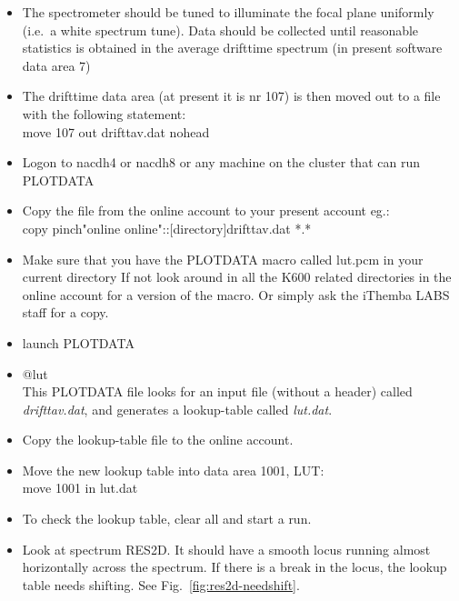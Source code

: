 \documentclass[11pt]{report}
\begin{document}
\begin{itemize}
\item   The spectrometer should be tuned to illuminate the 
focal plane uniformly (i.e.~a white spectrum tune).  
Data should be collected until reasonable statistics is obtained in the 
average drifttime spectrum (in present software data area 7)

\item   The drifttime data area (at present it is nr 107) is then moved out to a file with the following statement:\\ 
        move 107 out drifttav.dat nohead

\item   Logon to nacdh4 or nacdh8 or any machine on the cluster that can 
run PLOTDATA

\item   Copy the file from the online account to your present account eg.:\\ 
        copy pinch"online online"::[directory]drifttav.dat *.* 

\item   Make sure that you have the PLOTDATA macro called lut.pcm in your current directory
        If not look around in all the K600 related directories in the online account for a  
        version of the macro. Or simply ask the iThemba LABS staff for a copy.

\item   launch PLOTDATA

\item   @lut\\
        This PLOTDATA file looks for an input file (without a header) called
        {\it drifttav.dat}, and generates a lookup-table called {\it lut.dat}. 

\item   Copy the lookup-table file to the online account.

\item   Move the new lookup table into data area 1001, LUT:\\ 
	move 1001 in lut.dat    

\item   To check the lookup table, clear all and start a run.

\item   Look at spectrum RES2D. It should have a smooth locus
running almost horizontally across the spectrum. If there is a break in
the locus, the lookup table needs shifting. See Fig.~\ref{fig:res2d-needshift}.


\end{itemize}
\end{document}
